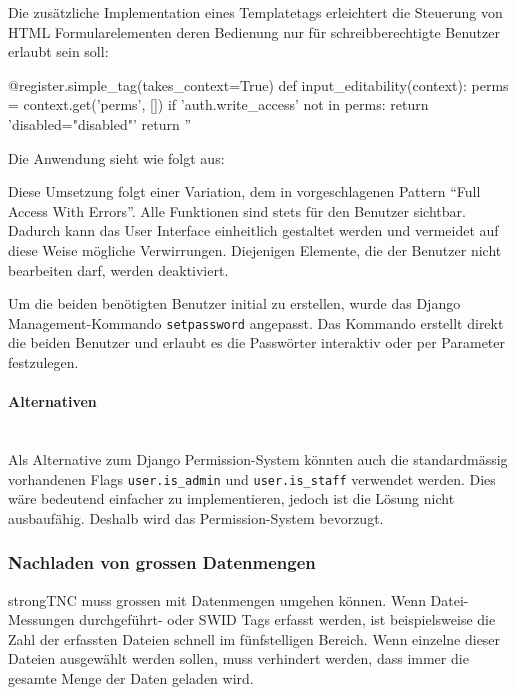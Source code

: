 
Die zusätzliche Implementation eines Templatetags erleichtert die Steuerung von HTML Formularelementen deren Bedienung nur für schreibberechtigte Benutzer erlaubt sein soll:

\begin{pythoncode}
@register.simple_tag(takes_context=True)
def input_editability(context):
    perms = context.get('perms', [])
    if 'auth.write_access' not in perms:
        return 'disabled="disabled"'
    return ''
\end{pythoncode}

Die Anwendung sieht wie folgt aus:


Diese Umsetzung folgt einer Variation, dem in \cite{posa1} vorgeschlagenen Pattern \enquote{Full Access With Errors}. Alle Funktionen sind stets für den Benutzer sichtbar. Dadurch kann das User Interface einheitlich gestaltet werden und vermeidet auf diese Weise mögliche Verwirrungen. Diejenigen Elemente, die der Benutzer nicht bearbeiten darf, werden deaktiviert. 

Um die beiden benötigten Benutzer initial zu erstellen, wurde das Django
Management-Kommando \texttt{setpassword} angepasst. Das Kommando erstellt direkt
die beiden Benutzer und erlaubt es die Passwörter interaktiv oder per Parameter
festzulegen.

\paragraph{Alternativen} \hspace{0px} \\
Als Alternative zum Django Permission-System könnten auch die standardmässig
vorhandenen Flags \texttt{user.is\_admin} und \texttt{user.is\_staff} verwendet
werden. Dies wäre bedeutend einfacher zu implementieren, jedoch ist die Lösung
nicht ausbaufähig. Deshalb wird das Permission-System bevorzugt.

\subsubsection{Nachladen von grossen Datenmengen}
strongTNC muss grossen mit Datenmengen umgehen können. Wenn Datei-Messungen
durchgeführt- oder SWID Tags erfasst werden, ist beispielsweise die Zahl der
erfassten Dateien schnell im fünfstelligen Bereich. Wenn einzelne dieser Dateien
ausgewählt werden sollen, muss verhindert werden, dass immer die gesamte Menge
der Daten geladen wird.

